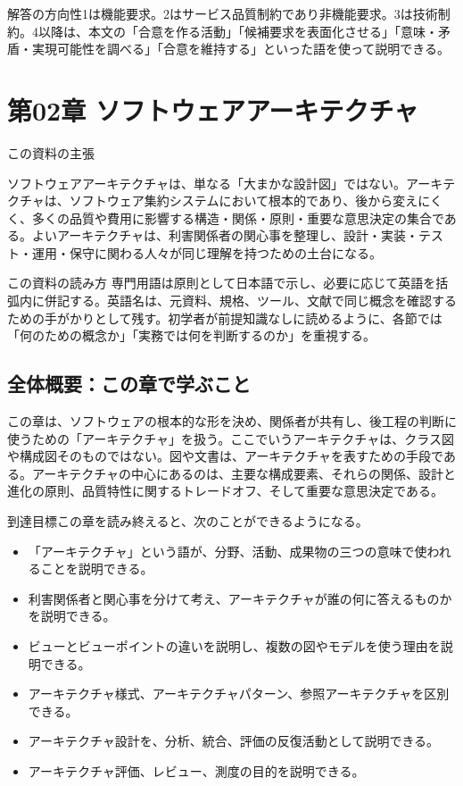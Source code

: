 \documentclass[a4paper,11pt]{ltjsarticle}
\numberwithin{figure}{section}
\numberwithin{table}{section}
\newcommand{\MiniBox}[2]{\par\smallskip\begin{statementbox}{#1}#2\end{statementbox}\par\smallskip}
\begin{document}
\MiniBox{解答の方向性}{1は機能要求。2はサービス品質制約であり非機能要求。3は技術制約。4以降は、本文の「合意を作る活動」「候補要求を表面化させる」「意味・矛盾・実現可能性を調べる」「合意を維持する」といった語を使って説明できる。}

\section{第02章 ソフトウェアアーキテクチャ}
\noindent この資料の主張\par
ソフトウェアアーキテクチャは、単なる「大まかな設計図」ではない。アーキテクチャは、ソフトウェア集約システムにおいて根本的であり、後から変えにくく、多くの品質や費用に影響する構造・関係・原則・重要な意思決定の集合である。よいアーキテクチャは、利害関係者の関心事を整理し、設計・実装・テスト・運用・保守に関わる人々が同じ理解を持つための土台になる。

\begin{statementbox}{この資料の読み方}
専門用語は原則として日本語で示し、必要に応じて英語を括弧内に併記する。英語名は、元資料、規格、ツール、文献で同じ概念を確認するための手がかりとして残す。初学者が前提知識なしに読めるように、各節では「何のための概念か」「実務では何を判断するのか」を重視する。
\end{statementbox}



\subsection*{全体概要：この章で学ぶこと}
この章は、ソフトウェアの根本的な形を決め、関係者が共有し、後工程の判断に使うための「アーキテクチャ」を扱う。ここでいうアーキテクチャは、クラス図や構成図そのものではない。図や文書は、アーキテクチャを表すための手段である。アーキテクチャの中心にあるのは、主要な構成要素、それらの関係、設計と進化の原則、品質特性に関するトレードオフ、そして重要な意思決定である。

\noindent 到達目標\quad この章を読み終えると、次のことができるようになる。
\begin{itemize}
  \item 「アーキテクチャ」という語が、分野、活動、成果物の三つの意味で使われることを説明できる。
  \item 利害関係者と関心事を分けて考え、アーキテクチャが誰の何に答えるものかを説明できる。
  \item ビューとビューポイントの違いを説明し、複数の図やモデルを使う理由を説明できる。
  \item アーキテクチャ様式、アーキテクチャパターン、参照アーキテクチャを区別できる。
  \item アーキテクチャ設計を、分析、統合、評価の反復活動として説明できる。
  \item アーキテクチャ評価、レビュー、測度の目的を説明できる。
\end{itemize}
\end{document}
